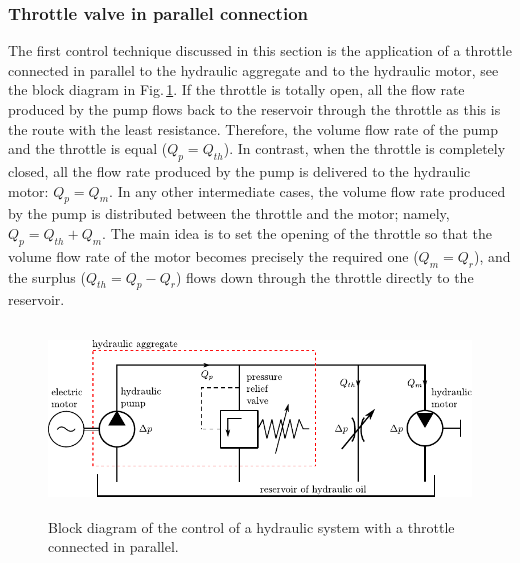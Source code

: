 \subsubsection{Throttle valve in parallel connection}
The first control technique discussed in this section is the application of a throttle connected in parallel to the hydraulic aggregate and to the hydraulic motor, see the block diagram in Fig.\,\ref{fig:control_of_hydraulic_system_parallel_throttle}. If the throttle is totally open, all the flow rate produced by the pump flows back to the reservoir through the throttle as this is the route with the least resistance. Therefore, the volume flow rate of the pump and the throttle is equal ($Q_p=Q_{th}$). In contrast, when the throttle is completely closed, all the flow rate produced by the pump is delivered to the hydraulic motor: $Q_p=Q_m$. In any other intermediate cases, the volume flow rate produced by the pump is distributed between the throttle and the motor; namely, $Q_p=Q_{th}+Q_{m}$. The main idea is to set the opening of the throttle so that the volume flow rate of the motor becomes precisely the required one ($Q_m=Q_r$), and the surplus ($Q_{th}=Q_p-Q_r$) flows down through the throttle directly to the reservoir.

\begin{figure}[ht!]
	\centering
		\includegraphics[height=5cm]{PositiveDisplacementPumps/Figures/Control_Of_Hydraulic_System_Parallel_Throttle.pdf}
	\caption{Block diagram of the control of a hydraulic system with a throttle connected in parallel.}
	\label{fig:control_of_hydraulic_system_parallel_throttle}
\end{figure}

